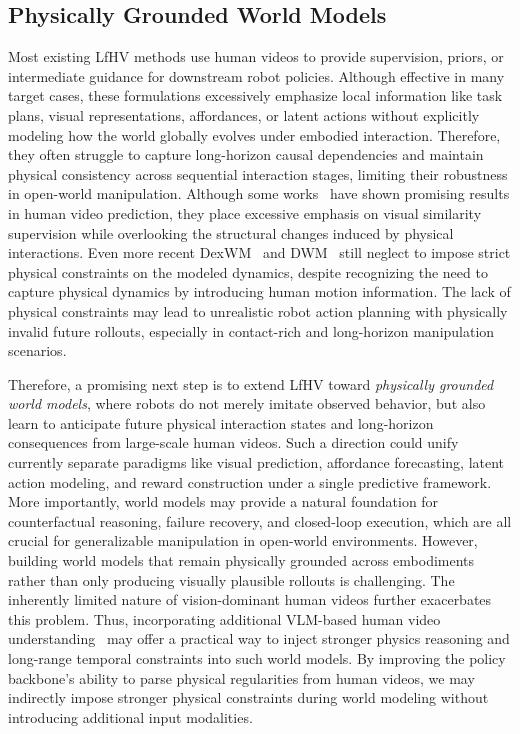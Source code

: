 \documentclass[Afour,sageh,times]{sagej}
\begin{document}
\subsection{Physically Grounded World Models}
Most existing LfHV methods use human videos to provide supervision, priors, or intermediate guidance for downstream robot policies. Although effective in many target cases, these formulations excessively emphasize local information like task plans, visual representations, affordances, or latent actions without explicitly modeling how the world globally evolves under embodied interaction. Therefore, they often struggle to capture long-horizon causal dependencies and maintain physical consistency across sequential interaction stages, limiting their robustness in open-world manipulation. 
Although some works~\citep{wu2023unleashing,mendonca2023structured,cheang2024gr,zhu2025learning} have shown promising results in human video prediction, they place excessive emphasis on visual similarity supervision while overlooking the structural changes induced by physical interactions. Even more recent DexWM~\citep{goswami2025world} and DWM~\citep{kim2025dexterous} still neglect to impose strict physical constraints on the modeled dynamics, despite recognizing the need to capture physical dynamics by introducing human motion information. The lack of physical constraints may lead to unrealistic robot action planning with physically invalid future rollouts, especially in contact-rich and long-horizon manipulation scenarios.

Therefore, a promising next step is to extend LfHV toward \textit{physically grounded world models}, where robots do not merely imitate observed behavior, but also learn to anticipate future physical interaction states and long-horizon consequences from large-scale human videos. Such a direction could unify currently separate paradigms like visual prediction, affordance forecasting, latent action modeling, and reward construction under a single predictive framework. More importantly, world models may provide a natural foundation for counterfactual reasoning, failure recovery, and closed-loop execution, which are all crucial for generalizable manipulation in open-world environments. However, building world models that remain physically grounded across embodiments rather than only producing visually plausible rollouts is challenging. The inherently limited nature of vision-dominant human videos further exacerbates this problem. Thus, incorporating additional VLM-based human video understanding~\citep{cheng2024egothink,plizzari2025omnia,vinod2025egovlm,su2025annexe,lin2025physbrain} may offer a practical way to inject stronger physics reasoning and long-range temporal constraints into such world models. By improving the policy backbone's ability to parse physical regularities from human videos, we may indirectly impose stronger physical constraints during world modeling without introducing additional input modalities. 
\end{document}
